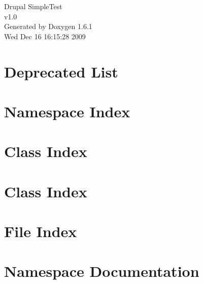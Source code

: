 \documentclass[a4paper]{book}
\begin{document}
\hypersetup{pageanchor=false}
\begin{titlepage}
\vspace*{7cm}
\begin{center}
{\Large Drupal SimpleTest \\[1ex]\large v1.0 }\\
\vspace*{1cm}
{\large Generated by Doxygen 1.6.1}\\
\vspace*{0.5cm}
{\small Wed Dec 16 16:15:28 2009}\\
\end{center}
\end{titlepage}
\clearemptydoublepage
{}
\tableofcontents
\clearemptydoublepage
{}
\hypersetup{pageanchor=true}
\chapter{Deprecated List}
\label{deprecated}
\hypertarget{deprecated}{}

\chapter{Namespace Index}

\chapter{Class Index}

\chapter{Class Index}

\chapter{File Index}

\chapter{Namespace Documentation}

\end{document}
